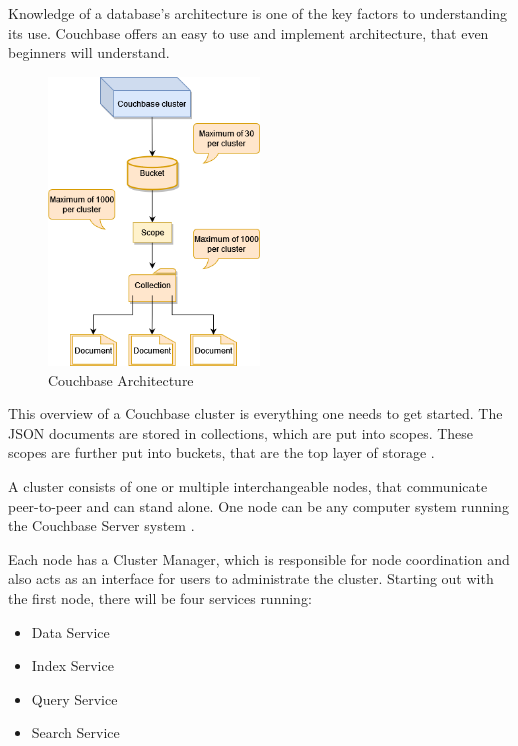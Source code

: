 Knowledge of a database's architecture is one of the key factors to understanding its use. Couchbase offers an easy to use and implement architecture, that even beginners will understand.

\begin{figure}[H]
    \centering
    \caption[Couchbase Architecture]{Couchbase Architecture \parencite{CouchbaseArchitecture}} \label{fig:CouchbaseArchitecture}
    \includegraphics[width=0.5\textwidth]{images/CouchbaseArchitecture.drawio.png}
\end{figure}

This overview of a Couchbase cluster is everything one needs to get started. The \ac{JSON} documents are stored in collections, which are put into scopes. These scopes are further put into buckets, that are the top layer of storage \parencite{CouchbaseIntroduction}.

A cluster consists of one or multiple interchangeable nodes, that communicate peer-to-peer and can stand alone. One node can be any computer system running the Couchbase Server system \parencite{CouchbasePaper}.

Each node has a Cluster Manager, which is responsible for node coordination and also acts as an interface for users to administrate the cluster. Starting out with the first node, there will be four services running:

\begin{itemize}
    \item Data Service
    \item Index Service
    \item Query Service
    \item Search Service
\end{itemize}

